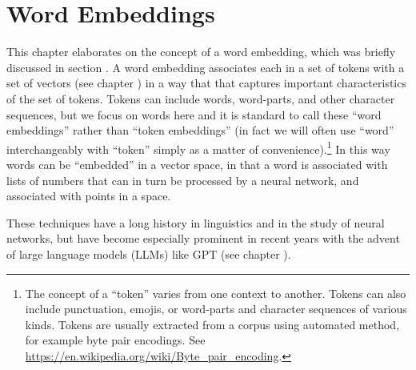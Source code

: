 \chapter{Word Embeddings}\label{ch_word_embeddings}


This chapter elaborates on the concept of a word embedding, which was briefly discussed in section . A word embedding associates each  in a set of tokens with a set of vectors (see chapter ) in a way that that captures important characteristics of the set of tokens. Tokens can include words, word-parts, and other character sequences, but we focus on words here and it is standard to call these ``word embeddings'' rather than ``token embeddings'' (in fact we will often use ``word'' interchangeably with ``token'' simply as a matter of convenience).\footnote{The concept of a ``token'' varies from one context to another. Tokens can also include punctuation, emojis, or word-parts and character sequences of various kinds. Tokens are usually extracted from a corpus using automated method, for example byte pair encodings. See \url{https://en.wikipedia.org/wiki/Byte_pair_encoding}.} In this way words can be ``embedded'' in a vector space, in that a word is associated with lists of numbers that can in turn be processed by a neural network, and associated with points in a space. 

These techniques have a long history in linguistics and in the study of neural networks, but have become especially prominent in recent years with the advent of large language models (LLMs) like GPT (see chapter ). 

